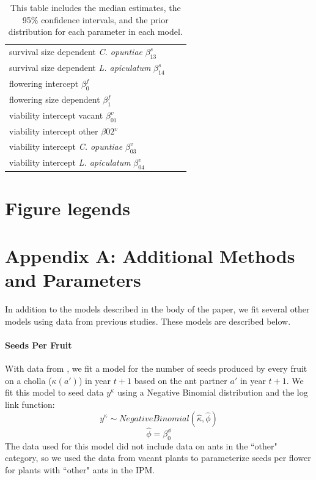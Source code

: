 \documentclass[11pt]{article}
\begin{document}
\begin{table}[]
\begin{tabular}{l|l|l}
    survival size dependent \textit{C. opuntiae} $\beta_{13}^s$ & & \\
    survival size dependent \textit{L. apiculatum} $\beta_{14}^s$ & & \\
    \hline
    flowering intercept $\beta_0^f$ & & \\
    flowering size dependent $\beta_1^f$ & & \\
    \hline
    viability intercept vacant $\beta_01^v$ & & \\
    viability intercept other $\beta02^v$ & & \\
    viability intercept \textit{C. opuntiae} $\beta_03^v$ & & \\
    viability intercept \textit{L. apiculatum} $\beta_04^v$ & & 

  \end{tabular}
  \caption{This table includes the median estimates, the 95$\%$ confidence intervals, and the prior distribution for each parameter in each model.}
  \label{tab:Params}
  \end{table}

\section*{Figure legends}


\appendix
\label{appendix}
\section*{Appendix A: Additional Methods and Parameters} \label{appendix:A}
In addition to the models described in the body of the paper, we fit several other models using data from previous studies.
These models are described below.

\paragraph{Seeds Per Fruit}
With data from \cite{Miller2006}, we fit a model for the number of seeds produced by every fruit on a cholla ($\kappa(a')$) in year $t+1$ based on the ant partner $a'$ in year $t+1$.
We fit this model to seed data $y^{\kappa}$ using a Negative Binomial distribution and the log link function: 
$$y^{\kappa} \sim  Negative Binomial(\hat{\kappa},\hat{\phi})$$
$$\hat{\phi} = \beta_{0}^{\phi}$$
The data used for this model did not include data on ants in the ``other" category, so we used the data from vacant plants to parameterize seeds per flower for plants with ``other" ants in the IPM.
\end{document}
